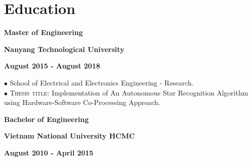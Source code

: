 \documentclass[10pt]{article}
\begin{document}
    \section{Education}

        \begin{multicols}{3}
            \begin{flushleft}
                \textbf{Master of Engineering}
            \end{flushleft}

            \columnbreak

            \begin{center}
                \textbf{Nanyang Technological University}
            \end{center}

            \columnbreak

            \begin{flushright}
                \textbf{August 2015 - August 2018}
            \end{flushright}
        \end{multicols}

        \vspace{-5mm}

        $\bullet$ {School of Electrical and Electronics Engineering - Research.} \\
        $\bullet$ \textsc{Thesis title}: Implementation of An Autonomous Star Recognition Algorithm using Hardware-Software Co-Processing Approach.


        \begin{multicols}{3}
            \begin{flushleft}
                \textbf{Bachelor of Engineering}
            \end{flushleft}

            \columnbreak

            \begin{center}
                \textbf{Vietnam National University HCMC}
            \end{center}

            \columnbreak

            \begin{flushright}
                \textbf{August 2010 - April 2015}
            \end{flushright}
        \end{multicols}
\end{document}
